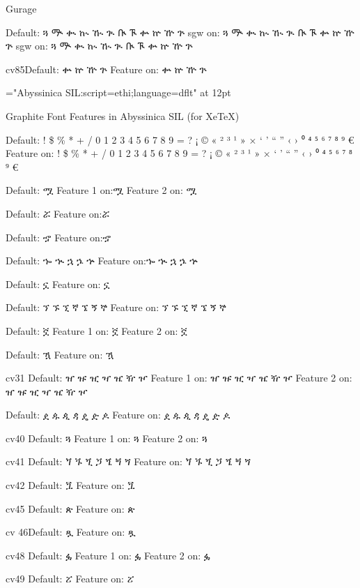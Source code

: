 \A Gurage

\IndSS  Default: ጓ ᎁ ቊ ኲ ዂ ጒ ᎅ ᎍ ቍ ኵ ዅ ጕ
\IndSS\sgw sgw on:  ጓ ᎁ ቊ ኲ ዂ ጒ ᎅ ᎍ ቍ ኵ ዅ ጕ
\IndSS\CHG sgw on:  ጓ ᎁ ቊ ኲ ዂ ጒ ᎅ ᎍ ቍ ኵ ዅ ጕ

\IndSS cv85Default: ቍ ኵ ዅ ጕ 
\IndSS\eightyfive Feature on: ቍ ኵ ዅ ጕ


\font\C="Abyssinica SIL:script=ethi;language=dflt" at 12pt


\A Graphite Font Features in Abyssinica SIL (for XeTeX)

\IndSS Default: ! \$ \% * + / 0 1 2 3 4 5 6 7 8 9 = ? ¡ © « ² ³ ¹ » × ‘ ’ “ ” ‹ › ⁰ ⁴ ⁵ ⁶ ⁷ ⁸ ⁹ €
\IndSS\one Feature on: ! \$ \% * + / 0 1 2 3 4 5 6 7 8 9 = ? ¡ © « ² ³ ¹ » × ‘ ’ “ ” ‹ › ⁰ ⁴ ⁵ ⁶ ⁷ ⁸ ⁹ €


\IndSS Default: ሟ
\IndSS\fourone Feature 1 on:ሟ
\IndSS\fourtwo Feature 2 on: ሟ

\IndSS Default: ሯ
\IndSS\five Feature on:ሯ

\IndSS Default: ኇ
\IndSS\seventeen Feature on:ኇ

\IndSS Default: ኈ ኊ ኋ ኌ ኍ
\IndSS\eighteen Feature on:ኈ ኊ ኋ ኌ ኍ

\IndSS Default: ኗ
\IndSS\nineteen Feature on: ኗ

\IndSS Default: ኘ ኙ ኚ ኛ ኜ ኝ ኞ
\IndSS\twenty Feature on: ኘ ኙ ኚ ኛ ኜ ኝ ኞ

\IndSS Default: ኟ
\IndSS\twentyoneone Feature 1 on: ኟ
\IndSS\twentyonetwo Feature 2 on: ኟ

\IndSS Default: ዃ
\IndSS\twentysix Feature on: ዃ

\IndSS cv31 Default: ዠ ዡ ዢ ዣ ዤ ዥ ዦ
\IndSS\thirtyoneone Feature 1 on: ዠ ዡ ዢ ዣ ዤ ዥ ዦ
\IndSS\thirtyonetwo Feature 2 on: ዠ ዡ ዢ ዣ ዤ ዥ ዦ

\IndSS Default: ዸ ዹ ዺ ዻ ዼ ዽ ዾ
\IndSS\thirtytwo Feature on: ዸ ዹ ዺ ዻ ዼ ዽ ዾ

\IndSS cv40 Default: ጓ
\IndSS\fortyone Feature 1 on: ጓ
\IndSS\fortytwo Feature 2 on: ጓ

\IndSS cv41 Default: ጘ ጙ ጚ ጛ ጜ ጝ ጞ
\IndSS\fortyoneone Feature on: ጘ ጙ ጚ ጛ ጜ ጝ ጞ

\IndSS cv42 Default: ጟ
\IndSS\fortytwoone Feature on: ጟ

\IndSS cv45 Default: ጵ
\IndSS\fortyfive Feature on: ጵ

\IndSS cv 46Default: ጿ
\IndSS\fortysix Feature on: ጿ

\IndSS cv48 Default: ፏ
\IndSS\fortyeightone Feature 1 on: ፏ
\IndSS\fortyeighttwo Feature 2 on: ፏ

\IndSS cv49 Default: ፘ
\IndSS\fortynine Feature on: ፘ

